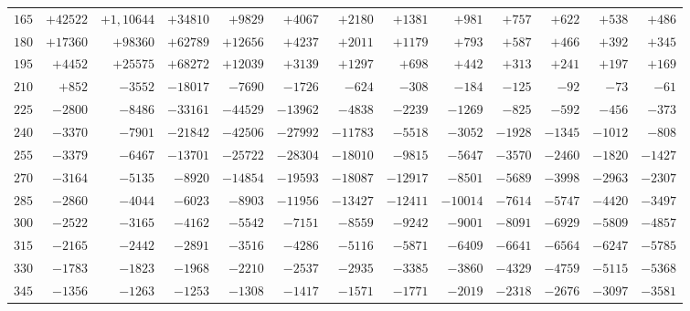 \begin{landscape}
\begin{center}
\begin{tabular}{@{}r|*{11}{r|}r@{}}
\(165\) & \(+42522\) & \(+1{,}10644\) & \(+34810\) & \(+9829\) & \(+4067\) & \(+2180\) & \(+1381\) & \(+981\) & \(+757\) & \(+622\) & \(+538\) & \(+486\)\\
\(180\) & \(+17360\) & \(+98360\) & \(+62789\) & \(+12656\) & \(+4237\) & \(+2011\) & \(+1179\) & \(+793\) & \(+587\) & \(+466\) & \(+392\) & \(+345\)\\
\(195\) & \(+4452\) & \(+25575\) & \(+68272\) & \(+12039\) & \(+3139\) & \(+1297\) & \(+698\) & \(+442\) & \(+313\) & \(+241\) & \(+197\) & \(+169\)\\
\(210\) & \(+852\) & \(-3552\) & \(-18017\) & \(-7690\) & \(-1726\) & \(-624\) & \(-308\) & \(-184\) & \(-125\) & \(-92\) & \(-73\) & \(-61\)\\
\(225\) & \(-2800\) & \(-8486\) & \(-33161\) & \(-44529\) & \(-13962\) & \(-4838\) & \(-2239\) & \(-1269\) & \(-825\) & \(-592\) & \(-456\) & \(-373\)\\
\(240\) & \(-3370\) & \(-7901\) & \(-21842\) & \(-42506\) & \(-27992\) & \(-11783\) & \(-5518\) & \(-3052\) & \(-1928\) & \(-1345\) & \(-1012\) & \(-808\)\\
\(255\) & \(-3379\) & \(-6467\) & \(-13701\) & \(-25722\) & \(-28304\) & \(-18010\) & \(-9815\) & \(-5647\) & \(-3570\) & \(-2460\) & \(-1820\) & \(-1427\)\\
\(270\) & \(-3164\) & \(-5135\) & \(-8920\) & \(-14854\) & \(-19593\) & \(-18087\) & \(-12917\) & \(-8501\) & \(-5689\) & \(-3998\) & \(-2963\) & \(-2307\)\\
\(285\) & \(-2860\) & \(-4044\) & \(-6023\) & \(-8903\) & \(-11956\) & \(-13427\) & \(-12411\) & \(-10014\) & \(-7614\) & \(-5747\) & \(-4420\) & \(-3497\)\\
\(300\) & \(-2522\) & \(-3165\) & \(-4162\) & \(-5542\) & \(-7151\) & \(-8559\) & \(-9242\) & \(-9001\) & \(-8091\) & \(-6929\) & \(-5809\) & \(-4857\)\\
\(315\) & \(-2165\) & \(-2442\) & \(-2891\) & \(-3516\) & \(-4286\) & \(-5116\) & \(-5871\) & \(-6409\) & \(-6641\) & \(-6564\) & \(-6247\) & \(-5785\)\\
\(330\) & \(-1783\) & \(-1823\) & \(-1968\) & \(-2210\) & \(-2537\) & \(-2935\) & \(-3385\) & \(-3860\) & \(-4329\) & \(-4759\) & \(-5115\) & \(-5368\)\\
\(345\) & \(-1356\) & \(-1263\) & \(-1253\) & \(-1308\) & \(-1417\) & \(-1571\) & \(-1771\) & \(-2019\) & \(-2318\) & \(-2676\) & \(-3097\) & \(-3581\)\\
\end{tabular}
\end{center}

\end{landscape}
